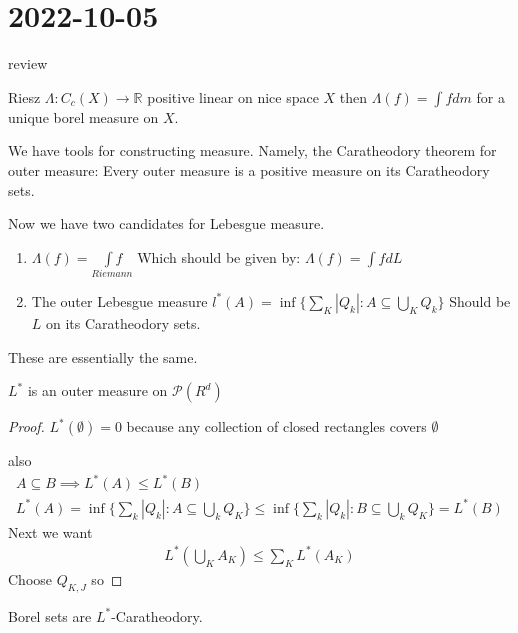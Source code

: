 \section{ 2022-10-05 }

review

\begin{theorem}
	Riesz $ \Lambda : C_c (X) \to \mathbb{R}$ positive linear on nice space $X$ then $\Lambda(f) = \int f dm$ for a unique borel measure on $X$.
\end{theorem}

We have tools for constructing measure. Namely, the Caratheodory theorem for outer measure: Every outer measure is a positive measure on its Caratheodory sets.

Now we have two candidates for Lebesgue measure.

\begin{enumerate}
	\item $\Lambda (f) = \underset{Riemann}{\int f}$
		Which should be given by: $\Lambda(f) = \int f dL$
	\item The outer Lebesgue measure  $l^* (A) = \inf\{\sum_K |Q_k| : A \subseteq \bigcup_{K} Q_k \}$ Should be $L$ on its Caratheodory sets.
\end{enumerate}

These are essentially the same.

\begin{lemma}
	$L^*$ is an outer measure on $\mathcal{P}(R^d)$
\end{lemma}

\begin{proof}
	$L^* (\emptyset)= 0$ because any collection of closed rectangles covers  $\emptyset$

	also
	 \begin{align*}
	A \subseteq B \implies L^*(A) \leq L^*(B) \\
	L^*(A) = \inf\{\sum_{k} |Q_k| : A \subseteq \bigcup_{k} Q_K \} \leq \inf\{\sum_{k} |Q_k| : B \subseteq \bigcup_{k} Q_K \} = L^*(B)
	\end{align*} 
	Next we want
	\begin{align*}
	L^*(\bigcup_{K} A_K) \leq \sum_{K} L^* (A_K)
	\end{align*} 
	Choose $Q_{K,J}$ so 

\end{proof}

\begin{lemma}
	Borel sets are $L^*$-Caratheodory.
\end{lemma}

